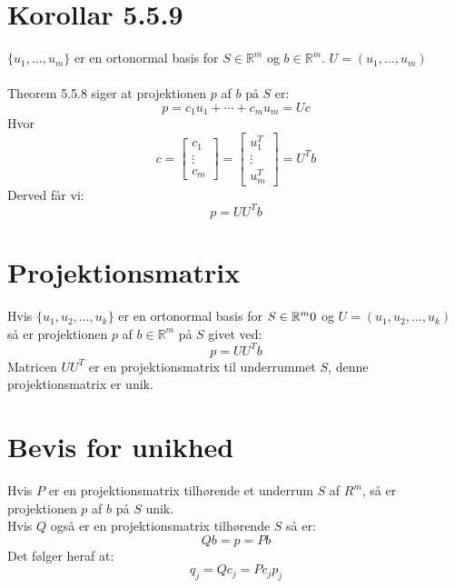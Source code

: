 \documentclass[a4paper,oneside,article]{memoir}
\begin{document}
	\section{Korollar 5.5.9}
	$\{u_1,\dots,u_m\}$ er en ortonormal basis for 
	$S\in \mathbb{R}^m$ og $b \in \mathbb{R}^m$. $U=(u_1,\dots,u_m)$
	\\
	\\
	Theorem 5.5.8 siger at projektionen $p$ af $b$ på $S$ er:
	$$p=c_1u_1+\cdots+c_mu_m=Uc$$
	Hvor
	$$c=\begin{bmatrix}
	c_1 \\
	\vdots \\
	c_m
	\end{bmatrix}=\begin{bmatrix}
	u^T_1\\
	\vdots \\
	u^T_m
	\end{bmatrix}=U^Tb$$
	Derved får vi: 
	$$p=UU^Tb$$
	
	\section{Projektionsmatrix}
	Hvis $\{u_1,u_2,\dots,u_k\}$ er en ortonormal basis for $S\in \mathbb{R}^m\\0$
	og $U=(u_1,u_2,\dots,u_k)$ så er projektionen $p$ af $b \in \mathbb{R}^m$
	på $S$ givet ved:
	$$p=UU^T b$$
	Matricen $UU^T$ er en projektionsmatrix til underrummet $S$,
	denne projektionsmatrix er unik.
	
	\section{Bevis for unikhed}
	Hvis $P$ er en projektionsmatrix tilhørende et 
	underrum $S$ af $R^m$, så er projektionen $p$
	af $b$ på $S$ unik.\\
	Hvis $Q$ også er en projektionsmatrix tilhørende $S$
	så er:
	$$Qb=p=Pb$$
	Det følger heraf at:
	$$q_j=Qc_j=Pc_jp_j$$
\end{document}
